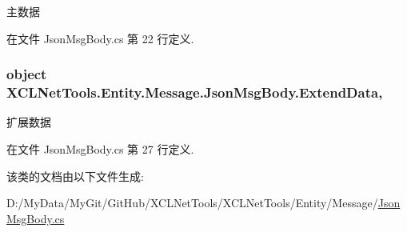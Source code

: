 主数据 



在文件 Json\-Msg\-Body.\-cs 第 22 行定义.

\hypertarget{class_x_c_l_net_tools_1_1_entity_1_1_message_1_1_json_msg_body_a0382629d68979ea8a39383a1d9891ab7}{
\subsubsection[{Extend\-Data}]{\setlength{\rightskip}{0pt plus 5cm}object X\-C\-L\-Net\-Tools.\-Entity.\-Message.\-Json\-Msg\-Body.\-Extend\-Data\hspace{0.3cm}{\ttfamily [get]}, {\ttfamily [set]}}}\label{class_x_c_l_net_tools_1_1_entity_1_1_message_1_1_json_msg_body_a0382629d68979ea8a39383a1d9891ab7}


扩展数据 



在文件 Json\-Msg\-Body.\-cs 第 27 行定义.



该类的文档由以下文件生成\-:\begin{DoxyCompactItemize}
\item 
D\-:/\-My\-Data/\-My\-Git/\-Git\-Hub/\-X\-C\-L\-Net\-Tools/\-X\-C\-L\-Net\-Tools/\-Entity/\-Message/\hyperlink{_json_msg_body_8cs}{Json\-Msg\-Body.\-cs}\end{DoxyCompactItemize}
